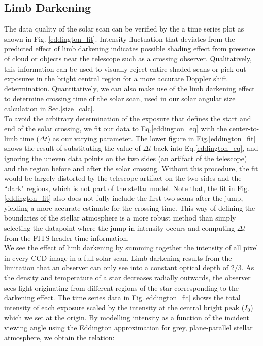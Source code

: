 \documentclass[authoryear, 12pt,5p, times]{elsarticle}
\begin{document}
\subsection{Limb Darkening}
The data quality of the solar scan can be verified by the a time series plot as shown in Fig. \ref{eddington_fit}. Intensity fluctuation that deviates from the predicted effect of limb darkening indicates possible shading effect from presence of cloud or objects near the telescope such as a crossing observer. Qualitatively, this information can be used to visually reject entire shaded scans or pick out exposures in the bright central region for a more accurate Doppler shift determination. Quantitatively, we can also make use of the limb darkening effect to determine crossing time of the solar scan, used in our solar angular size calculation in Sec.\ref{size_calc}.
\\
To avoid the arbitrary determination of the exposure that defines the start and end of the solar crossing, we fit our data to Eq.\ref{eddington_eq} with the center-to-limb time ($\Delta t$) as our varying parameter.  The lower figure in Fig.\ref{eddington_fit} shows the result of substituting the value of $\Delta t$ back into Eq.\ref{eddington_eq}, and ignoring the uneven data points on the two sides  (an artifact of the telescope) and the region before and after the solar crossing. Without this procedure, the fit would be largely distorted by the telescope artifact on the two sides and the ``dark" regions, which is not part of the stellar model.  Note that, the fit in Fig.\ref{eddington_fit} also does not fully include the first two scans after the jump, yielding a more accurate estimate for the crossing time. This way of defining the boundaries of the stellar atmosphere is a more robust method than simply selecting the datapoint where the jump in intensity occurs and computing $\Delta t$ from the FITS header time information.
\\
We see the effect of limb darkening by summing together the intensity of all pixel in every CCD image in a full solar scan. Limb darkening results from the limitation that an observer can only see into a constant optical depth of 2/3. As the density and temperature of a star decreases radially outwards, the observer sees light originating from different regions of the star corresponding to the darkening effect. The time series data in Fig.\ref{eddington_fit} shows the total intensity of each exposure scaled by the intensity at the central bright peak ($I_0$) which we set at the origin. By modelling intensity as a function of the incident viewing angle using the Eddington approximation for grey, plane-parallel stellar atmosphere, we obtain the relation: 
\end{document}
